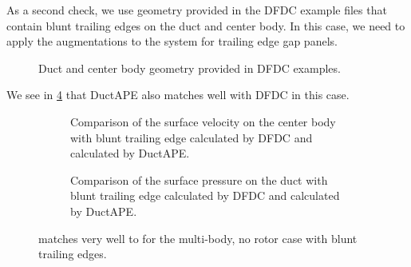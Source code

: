 As a second check, we use geometry provided in the DFDC example files that contain blunt trailing edges on the duct and center body.
%
In this case, we need to apply the augmentations to the system for trailing edge gap panels.
%
\begin{figure}[hb!]
    \centering
        
        \caption{Duct and center body geometry provided in DFDC examples.}
    \label{fig:ducthubvalgeom}
\end{figure}
%
We see in \cref{fig:dfdcexamplecomp} that DuctAPE also matches well with DFDC in this case.

\begin{figure}[h!]
     \centering
     \begin{subfigure}[b]{0.45\textwidth}
         \raggedright
         \caption{Comparison of the surface velocity on the center body with blunt trailing edge calculated by DFDC and calculated by DuctAPE.}
        \label{fig:dfdcexamplevel}
     \end{subfigure}
     \hfill
     \begin{subfigure}[b]{0.45\textwidth}
         \raggedright
         \caption{Comparison of the surface pressure on the duct with blunt trailing edge calculated by DFDC and calculated by DuctAPE.}
         \label{fig:dfdcexamplecp}
     \end{subfigure}
     \caption{ matches very well to  for the multi-body, no rotor case with blunt trailing edges.}
     \label{fig:dfdcexamplecomp}
\end{figure}
